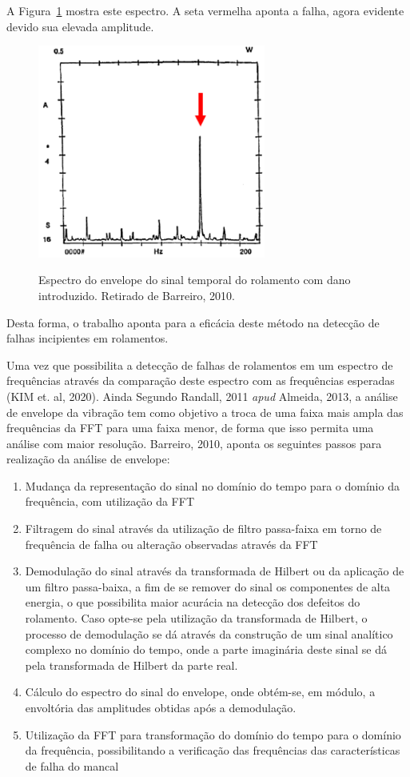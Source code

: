 \documentclass[
	12pt,				
	oneside,			
	a4paper,			
	english,			
	brazil,			
	]{abntex2ppgsi}
\begin{document}
A Figura~\ref{espectro_do_envelope_barreiro} mostra este espectro. A seta vermelha aponta a falha, agora evidente devido sua elevada amplitude.

\begin{figure}[H]
\centering
\caption {Espectro do envelope do sinal temporal do rolamento com dano introduzido. Retirado de Barreiro, 2010.}
\includegraphics[width=\textwidth,height=70mm,keepaspectratio]{espectro_do_envelope_barreiro}
\label{espectro_do_envelope_barreiro}
\end{figure}

Desta forma, o trabalho aponta para a eficácia deste método na detecção de falhas incipientes em rolamentos. 

Uma vez que possibilita a detecção de falhas de rolamentos em um espectro de frequências através da comparação deste espectro com as frequências esperadas (KIM et. al, 2020). Ainda Segundo Randall, 2011 \textit{apud} Almeida, 2013, a análise de envelope da vibração tem como objetivo a troca de uma faixa mais ampla das frequências da FFT para uma faixa menor, de forma que isso permita uma análise com maior resolução. Barreiro, 2010, aponta os seguintes passos para realização da análise de envelope:

\begin{enumerate}
	\item Mudança da representação do sinal no domínio do tempo para o domínio da frequência, com utilização da FFT
	\item Filtragem do sinal através da utilização de filtro passa-faixa em torno de frequência de falha ou alteração observadas através da FFT
	\item Demodulação do sinal através da transformada de Hilbert ou da aplicação de um filtro passa-baixa, a fim de se remover do sinal os componentes de alta energia, o que possibilita maior acurácia na detecção dos defeitos do rolamento. Caso opte-se pela utilização da transformada de Hilbert, o processo de demodulação se dá através da construção de um sinal analítico complexo no domínio do tempo, onde a parte imaginária deste sinal se dá pela transformada de Hilbert da parte real.  
	\item Cálculo do espectro do sinal do envelope, onde obtém-se, em módulo, a envoltória das amplitudes obtidas após a demodulação.
	\item Utilização da FFT para transformação do domínio do tempo para o domínio da frequência, possibilitando a verificação das frequências das características de falha do mancal
\end{enumerate}
\end{document}
